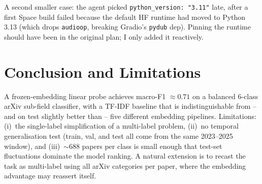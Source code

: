 \documentclass[10pt]{article}
\begin{document}
A second smaller case: the agent picked \texttt{python\_version: "3.11"}
late, after a first Space build failed because the default HF runtime had
moved to Python 3.13 (which drops \texttt{audioop}, breaking Gradio's
\texttt{pydub} dep). Pinning the runtime should have been in the original
plan; I only added it reactively.

\section{Conclusion and Limitations}
A frozen-embedding linear probe achieves macro-F1 $\approx 0.71$ on a
balanced 6-class arXiv sub-field classifier, with a TF-IDF baseline that is
indistinguishable from -- and on test slightly better than -- five different
embedding pipelines. Limitations: (i)~the single-label simplification of a
multi-label problem, (ii)~no temporal generalisation test (train, val, and
test all come from the same 2023--2025 window), and (iii)~$\sim 688$ papers
per class is small enough that test-set fluctuations dominate the model
ranking. A natural extension is to recast the task as multi-label using all
arXiv categories per paper, where the embedding advantage may reassert
itself.



\end{document}
